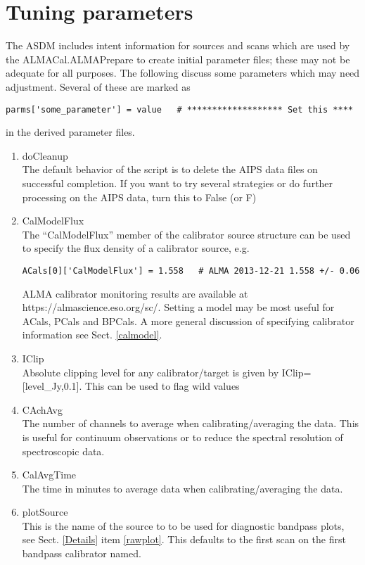 \documentclass[11pt]{article}
\begin{document}
\section{Tuning parameters}\label{Tune}
The ASDM includes intent information for sources and scans which are
used by the ALMACal.ALMAPrepare to create initial parameter files;
these may not be adequate for all purposes.
The following discuss some parameters which may need adjustment.
Several of these are marked as
\begin{verbatim}
parms['some_parameter'] = value   # ******************* Set this ****
\end{verbatim}
in the derived parameter files.
\begin{enumerate}
\item doCleanup\\
The default behavior of the script is to delete the AIPS data files on
successful completion.
If you want to try several strategies or do further processing on the
AIPS data, turn this to False (or F)
\item CalModelFlux\\
The ``CalModelFlux'' member of the calibrator source structure can be
used to specify the flux density of a calibrator source, e.g.
\begin{verbatim}
ACals[0]['CalModelFlux'] = 1.558   # ALMA 2013-12-21 1.558 +/- 0.06
\end{verbatim}
ALMA calibrator monitoring results are available at
https://almascience.eso.org/sc/.
Setting a model may be most useful for ACals, PCals and BPCals.
A more general discussion of specifying calibrator information see
Sect.  \ref{calmodel}.
\item IClip \\
Absolute clipping level for any calibrator/target is given by
IClip=[level\_Jy,0.1].
This can be used to flag wild values
\item CAchAvg \\
The number of channels to average when calibrating/averaging the data.
This is useful for continuum observations or to reduce the spectral
resolution of spectroscopic data.
\item CalAvgTime \\
The time in minutes to average data  when calibrating/averaging the data.
\item plotSource \\
This is the name of the source to to be used for diagnostic bandpass
plots, see Sect. \ref{Details} item \ref{rawplot}.
This defaults to the first scan on the first bandpass calibrator named.

\end{enumerate}
\end{document}
